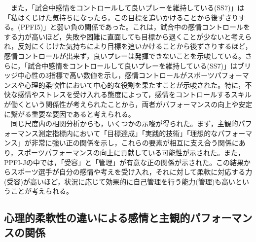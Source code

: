 \documentclass[12pt,a4paper,xelatex,ja=standard]{bxjsarticle}
\begin{document}
　また，「試合中感情をコントロールして良いプレーを維持している(SS7)」は「私はくじけた気持ちになったら，この目標を追いかけることから後ずさりする。(PPFI5)」と弱い負の関係であった。これは，試合中の感情コントロールをする力が高いほど，失敗や困難に直面しても目標から退くことが少ないと考えられ，反対にくじけた気持ちにより目標を追いかけることから後ずさりするほど，感情コントロールが出来ず，良いプレーは発揮できないことを示唆している。さらに，「試合中感情をコントロールして良いプレーを維持している(SS7)」はブリッジ中心性の3指標で高い数値を示し，感情コントロールがスポーツパフォーマンスや心理的柔軟性において中心的な役割を果たすことが示唆された。特に，不快な感情やストレスを受け入れる態度によって，感情をコントロールするスキルが働くという関係性が考えられたことから，両者がパフォーマンスの向上や安定に繋がる重要な要因であると考えられる。\\
　同じ尺度内の相関分析からも，いくつかの示唆が得られた。まず，主観的パフォーマンス測定指標内において「目標達成」「実践的技術」「理想的なパフォーマンス」が非常に強い正の関係を示し，これらの要素が相互に支え合う関係にあり，スポーツパフォーマンスの向上に貢献している可能性が示された。また，PPFI-Jの中では，「受容」と「管理」が有意な正の関係が示された。この結果からスポーツ選手が自分の感情や考えを受け入れ，それに対して柔軟に対応する力(受容)が高いほど，状況に応じて効果的に自己管理を行う能力(管理)も高いということが考えられる。

\hypertarget{ux5fc3ux7406ux7684ux67d4ux8edfux6027ux306eux9055ux3044ux306bux3088ux308bux611fux60c5ux3068ux4e3bux89b3ux7684ux30d1ux30d5ux30a9ux30fcux30deux30f3ux30b9ux306eux95a2ux4fc2}{%
\subsection{心理的柔軟性の違いによる感情と主観的パフォーマンスの関係}\label{ux5fc3ux7406ux7684ux67d4ux8edfux6027ux306eux9055ux3044ux306bux3088ux308bux611fux60c5ux3068ux4e3bux89b3ux7684ux30d1ux30d5ux30a9ux30fcux30deux30f3ux30b9ux306eux95a2ux4fc2}}
\end{document}
